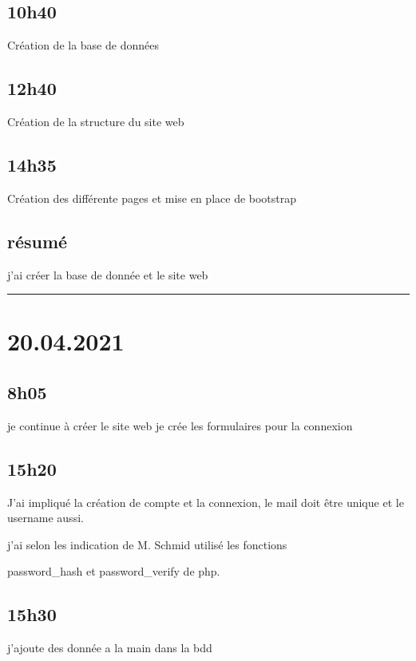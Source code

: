 \documentclass[a4paper,12pt,french]{sphinxmanual}
\begin{document}
\subsection{10h40}
\label{\detokenize{logbook:id4}}
\sphinxAtStartPar
Création de la base de données


\subsection{12h40}
\label{\detokenize{logbook:id5}}
\sphinxAtStartPar
Création de la structure du site web


\subsection{14h35}
\label{\detokenize{logbook:h35}}
\sphinxAtStartPar
Création des différente pages et mise en place de bootstrap


\subsection{résumé}
\label{\detokenize{logbook:resume}}
\sphinxAtStartPar
j’ai créer la base de donnée et le site web


\bigskip\hrule\bigskip



\section{20.04.2021}
\label{\detokenize{logbook:id6}}

\subsection{8h05}
\label{\detokenize{logbook:id7}}
\sphinxAtStartPar
je continue à créer le site web je crée les formulaires pour la connexion


\subsection{15h20}
\label{\detokenize{logbook:id8}}
\sphinxAtStartPar
J’ai impliqué la création de compte et la connexion, le mail doit être unique et le username aussi.

\sphinxAtStartPar
j’ai selon les indication de M. Schmid utilisé les fonctions

\sphinxAtStartPar
password\_hash et password\_verify de php.


\subsection{15h30}
\label{\detokenize{logbook:id9}}
\sphinxAtStartPar
j’ajoute des donnée a la main dans la bdd
\end{document}
